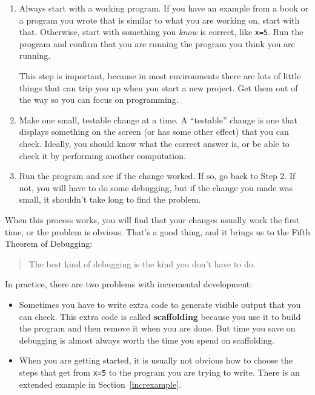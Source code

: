 \begin{enumerate}

\item Always start with a working program. If you have an
example from a book or a program you wrote that is similar to
what you are working on, start with that. Otherwise, start with
something you {\em know} is correct, like {\tt x=5}. Run the program
and confirm that you are running the program you think you are
running.

This step is important, because in most environments there
are lots of little things that can trip you up when you start a new
project. Get them out of the way so you can focus on programming.

\item Make one small, testable change at a time. A ``testable''
change is one that displays something on the screen (or has some
other effect) that you can check. Ideally, you should know what
the correct answer is, or be able to check it by performing another
computation. 

\item Run the program and see if the change worked. If so, go back
to Step 2. If not, you will have to do some debugging, but if the
change you made was small, it shouldn't take long to find the problem.

\end{enumerate}

When this process works, you will find that your changes usually
work the first time, or the problem is obvious. That's a good thing,
and it brings us to the Fifth Theorem of Debugging:

\begin{quote}
The best kind of debugging is the kind you don't have to do.
\end{quote}

In practice, there are two problems with incremental development:

\begin{itemize}

\item Sometimes you have to write extra code to
generate visible output that you can check. This extra code is
called {\bf scaffolding} because you use it to build the program
and then remove it when you are done. But time you save on
debugging is almost always worth the time you spend on
scaffolding.

\item When you are getting started, it is usually not obvious how to
choose the steps that get from {\tt x=5} to the program you are trying
to write. There is an extended example in Section~\ref{increxample}.

\end{itemize}

